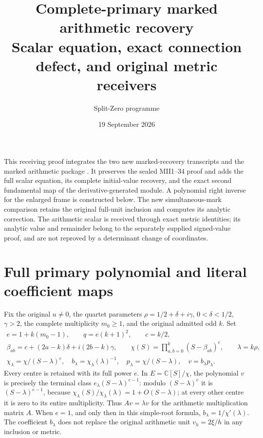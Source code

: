 \documentclass[11pt]{article}
\title{Complete-primary marked arithmetic recovery\\
\large Scalar equation, exact connection defect, and original metric receivers}
\author{Split-Zero programme}
\date{19 September 2026}
\newcommand{\CC}{\mathbb C}
\begin{document}
\maketitle

This receiving proof integrates the two new marked-recovery transcripts
and the marked arithmetic package \cite{arrival}. It preserves the sealed
MII1--34 proof \cite{mii} and adds the full scalar equation, its complete
initial-value recovery, and the exact second fundamental map of the
derivative-generated module. A polynomial right inverse for the enlarged
frame is constructed below. The new simultaneous-mark comparison retains
the original full-unit inclusion and computes its analytic correction.
The arithmetic scalar is received through exact metric identities; its
analytic value and remainder belong to the separately supplied signed-value
proof, and are not reproved by a determinant change of coordinates.

\section{Full primary polynomial and literal coefficient maps}
Fix the original $u\ne0$, the quartet parameters
$\rho=1/2+\delta+i\gamma$, $0<\delta<1/2$, $\gamma>2$, the
complete multiplicity $m_0\ge1$, and the original admitted odd $k$.
Set
\begin{equation}\tag{MAR1}\label{mar:objects}
 \begin{gathered}
 e=1+k(m_0-1),\qquad q=e(k+1)^2,\qquad c=k/2,\\
 \beta_{ab}=c+(2a-k)\delta+i(2b-k)\gamma,\qquad
 \chi(S)=\prod_{a,b=0}^{k}(S-\beta_{ab})^e,\qquad\lambda=k\rho,\\
 \chi_\lambda=\chi/(S-\lambda)^e,\quad
 b_\lambda=\chi_\lambda(\lambda)^{-1},\quad
 p_\lambda=\chi/(S-\lambda),\quad v=b_\lambda p_\lambda.
 \end{gathered}
\end{equation}
Every centre is retained with its full power $e$. In $E=\CC[S]/\chi$,
the polynomial $v$ is precisely the terminal class
$e_\lambda(S-\lambda)^{e-1}$: modulo $(S-\lambda)^e$ it is
$(S-\lambda)^{e-1}$, because
$\chi_\lambda(S)/\chi_\lambda(\lambda)=1+O(S-\lambda)$;
at every other centre it is zero to its entire multiplicity.
Thus $A v=\lambda v$ for the arithmetic multiplication matrix $A$.
When $e=1$, and only then in this simple-root formula,
$b_\lambda=1/\chi'(\lambda)$. The coefficient $b_\lambda$ does not
replace the original arithmetic unit $v_h=2\xi/h$ in any inclusion or metric.
\end{document}
